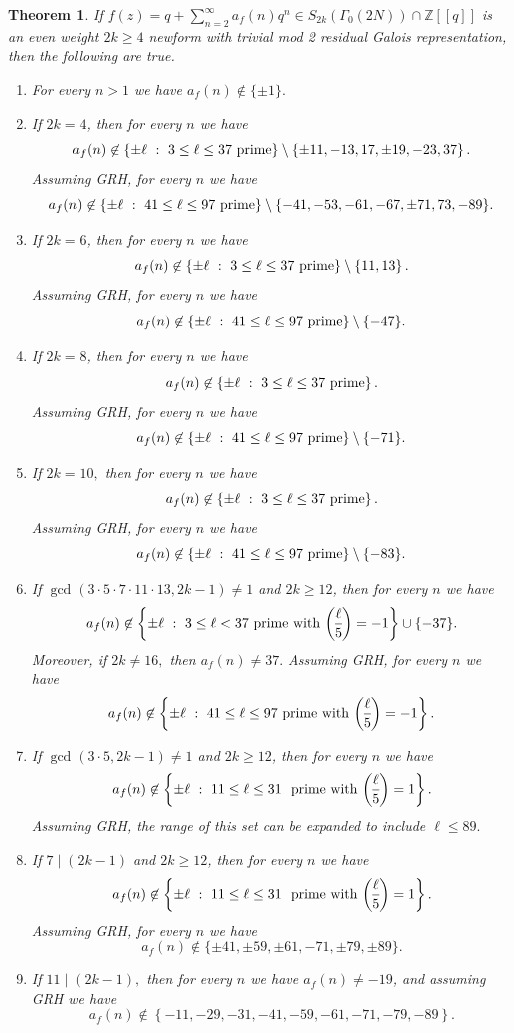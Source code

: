 \documentclass[12pt]{amsart}
\newtheorem{thm}{Theorem}[section]
\newcommand{\Z}{\mathbb{Z}}
\newcommand{\?}{\color{red}?}
\newcommand{\leg}[2]{\genfrac{(}{)}{}{}{#1}{#2}}
\numberwithin{equation}{section}
\begin{document}
\begin{thm}\label{LehmerGeneral} 
If  $f(z)=q+\sum_{n=2}^{\infty}a_f(n)q^n\in S_{2k}(\Gamma_0(2N))\cap \Z[[q]]$ is an even weight $2k\geq 4$ newform with trivial mod 2 residual Galois representation, then the following are true.
\begin{enumerate}
\item For every $n>1$ we have $a_f(n)\not \in \{\pm 1\}.$
\item If $2k=4$, then for every $n$ we have
$$
a_f(n)\not \in \left\{\pm \ell \ : \ 3\leq \ell \leq 37\ {\text {\rm prime}} \right\}\setminus\left 
\{ \pm11, -13,17,\pm19,-23,37\right\}.
$$
Assuming GRH, for every $n$ we have
$$
a_f(n) \not \in \{\pm \ell \ : \ 41 \leq \ell \leq 97 \ {\text {\rm prime}}\}\setminus\{-41,-53,-61,-67,\pm71,73,-89\}.
$$
\item If $2k=6$, then for every $n$ we have
$$
a_f(n)\not \in \left\{\pm \ell \ : \ 3\leq \ell \leq 37\  {\text {\rm prime}}\right\}\setminus\left \{ 11,13\right\}.
$$
Assuming GRH, for every $n$ we have
$$
a_f(n) \not \in \{\pm \ell \ : \ 41 \leq \ell \leq 97 \ {\text {\rm prime}}\}\setminus\{-47\}.
$$
\item If $2k=8$, then for every $n$ we have
$$
a_f(n)\not \in \left\{\pm \ell \ : \ 3\leq \ell \leq 37\  {\text {\rm prime}}\right\}.
$$
Assuming GRH, for every $n$ we have
$$
a_f(n) \not \in \{\pm \ell \ : \ 41\leq \ell \leq 97 \ {\text {\rm prime}}\}\setminus\{-71\}.
$$
\item If $2k=10,$ then for every $n$ we have
$$
a_f(n)\not \in \left\{\pm \ell \ : \ 3\leq \ell \leq 37\ {\text {\rm prime}} \right\}.
$$
Assuming GRH, for every $n$ we have
$$
a_f(n) \not \in \{\pm \ell \ : \ 41\leq \ell \leq 97\ {\text {\rm prime}}\}\setminus\{-83\}.
$$
\item  If $\gcd(3 \cdot 5\cdot 7\cdot 11\cdot 13, 2k-1)\neq 1$ and $2k\geq 12$, then for every $n$ we have 
$$
a_f(n)\not \in  \left \{ \pm \ell \ : \ 3\leq \ell <37 \ {\text {\rm prime with}}\ \leg{\ell}{5}=-1\right\}
\cup \{-37\}.
 $$
Moreover, if $2k\neq 16,$ then $a_f(n)\neq 37.$
Assuming GRH, for every $n$ we have
$$
a_f(n)\not \in  \left \{ \pm \ell \ : \ 41\leq \ell \leq 97 \ {\text {\rm prime with}}\ \leg{\ell}{5}=-1\right\}.
 $$
\item If $\gcd(3\cdot 5, 2k-1)\neq 1$ and $2k\geq 12$, then for every $n$ we have
$$a_f(n) \not \in \left \{\pm \ell \ : \  11\leq \ell \leq 31 \  \text{ {\rm prime with }} \leg{\ell}{5}=1\right\}.
$$
Assuming GRH, the range of this set can be expanded to include $\ell \leq 89.$
\item If $7\mid (2k-1)$ and $2k\geq 12$, then for every $n$ we have
$$a_f(n) \not \in \left \{\pm \ell \ : \  11\leq \ell \leq 31 \  \text{ {\rm prime with }} \leg{\ell}{5}=1\right\}.
$$
Assuming GRH, for every $n$ we have
$$
a_f(n)\not \in \{\pm 41, \pm 59, \pm 61, -71, \pm 79, \pm 89\}.
$$
\item If $11\mid (2k-1),$ then for every $n$ we have $a_f(n)\neq -19$, and assuming GRH
we have
 \begin{displaymath}
a_f(n)\not \in 
\left \{ -11, -29, -31, -41, -59, -61, -71, -79, -89\right\}.
\end{displaymath}


\end{enumerate}
\end{thm}
\end{document}
